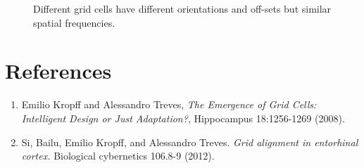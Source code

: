 \documentclass[a4paper, 12pt]{article}
\begin{document}
\begin{figure}
\hfill
{}
\hfill
{}
\hfill
\caption{Different grid cells have different orientations and off-sets but similar spatial frequencies.}
\label{diff}
\end{figure}

\section{References}
\begin{enumerate}
\item Emilio Kropff and Alessandro Treves, \textit{The Emergence of Grid Cells: Intelligent Design or Just Adaptation?}, Hippocampus 18:1256-1269 (2008).

\item Si, Bailu, Emilio Kropff, and Alessandro Treves. \textit{Grid alignment in entorhinal cortex.} Biological cybernetics 106.8-9 (2012).
\end{enumerate}
\end{document}
